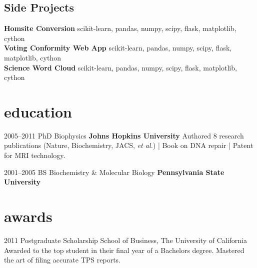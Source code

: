 \documentclass[]{friggeri-cv} %
\begin{document}
\subsection{Side Projects}
\textbf{{Homsite Conversion}} scikit-learn, pandas, numpy, scipy, flask, matplotlib, cython  \\
\textbf{{Voting Conformity Web App}} scikit-learn, pandas, numpy, scipy, flask, matplotlib, cython \\
\textbf{{Science Word Cloud}} scikit-learn, pandas, numpy, scipy, flask, matplotlib, cython \\

\section{education}

\begin{entrylist}


\entry
{2005--2011}
{PhD {\normalfont Biophysics}}
{\textbf{Johns Hopkins University}}
{Authored 8 research publications (Nature, Biochemistry, JACS, \textit{et al.}) | Book on DNA repair | Patent for MRI technology.}


\entry
{2001--2005}
{BS {\normalfont Biochemistry \& Molecular Biology}}
{\textbf{Pennsylvania State University}}
{}


\end{entrylist}



\section{awards}

\begin{entrylist}


\entry
{2011}
{Postgraduate Scholarship}
{School of Business, The University of California}
{Awarded to the top student in their final year of a Bachelors degree. Mastered the art of filing accurate TPS reports.}


\end{entrylist}
\end{document}
